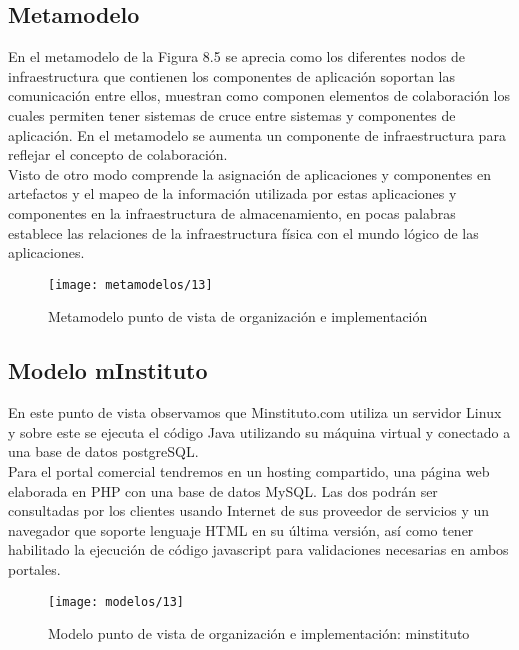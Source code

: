   \subsection{Metamodelo}
  En el metamodelo de la Figura 8.5 se aprecia como los diferentes nodos de infraestructura que contienen los componentes de aplicación soportan las comunicación entre ellos, muestran como componen elementos de colaboración los cuales permiten tener sistemas de cruce entre sistemas y componentes de aplicación. En el metamodelo se aumenta un componente de infraestructura para reflejar el concepto de colaboración. \\
  
  Visto de otro modo comprende la asignación de aplicaciones y componentes en artefactos y el mapeo de la información utilizada por estas aplicaciones y componentes en la infraestructura de almacenamiento, en pocas palabras establece las relaciones de la infraestructura física con el mundo lógico de las aplicaciones.
  
  \begin{figure}[H]
  	\centering
  	\texttt{[image: metamodelos/13]}
  	\captionsetup{width=.95\textwidth}
  	\caption{Metamodelo punto de vista de organización e implementación}
  	\label{metamodelo13}
  \end{figure}
  
  \subsection{Modelo mInstituto}
  En este punto de vista observamos que Minstituto.com utiliza un servidor Linux y sobre este se ejecuta el código Java utilizando su máquina virtual y conectado a una base de datos postgreSQL. \\
  
  Para el portal comercial tendremos en un hosting compartido, una página web elaborada en PHP con una base de datos MySQL. Las dos podrán ser consultadas por los clientes usando Internet de sus proveedor de servicios y un navegador que soporte lenguaje HTML en su última versión, así como tener habilitado la ejecución de código javascript para validaciones necesarias en ambos portales.

  \begin{figure}[H]
  	\centering
  	\texttt{[image: modelos/13]}
  	\captionsetup{width=.95\textwidth}
  	\caption{Modelo punto de vista de organización e implementación: minstituto}
  	\label{modelo13}
  \end{figure}

